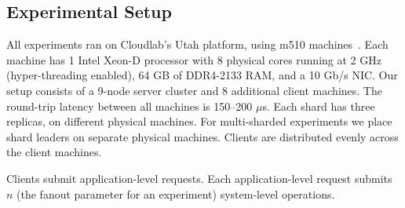 
\subsection{Experimental Setup}
All experiments ran on Cloudlab's Utah platform, using
m510 machines~\cite{duplyakin2019cloudlab}.  Each machine has 1 Intel Xeon-D processor with 8 physical cores
running at 2 GHz (hyper-threading enabled), 64 GB of DDR4-2133 RAM, and a 10
Gb/s NIC\@.  Our setup consists of a 9-node server cluster and 8 additional client machines.
The round-trip latency between all machines is 150--200 $\mu$s.  Each shard has three replicas,
on different physical machines. For multi-sharded experiments we place
shard leaders on separate physical machines. Clients are distributed
evenly across the client machines.





Clients submit application-level requests. Each application-level request
submits $n$ (the fanout parameter for an experiment) system-level operations.

